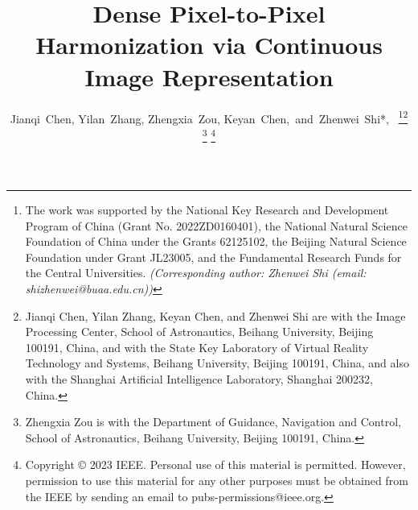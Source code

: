 \documentclass[10pt,journal,twocolumn,twoside]{IEEEtran}
\newcommand{\etal}{\textit{et al}. }
\begin{document}
\makeatletter
\DeclareRobustCommand\onedot{\futurelet\@let@token\@onedot}
\def\@onedot{\ifx\@let@token.\else.\null\fi\xspace}

\def\eg{\emph{e.g}\onedot} \def\Eg{\emph{E.g}\onedot}
\def\ie{\emph{i.e}\onedot} \def\Ie{\emph{I.e}\onedot}
\def\cf{\emph{cf}\onedot} \def\Cf{\emph{Cf}\onedot}
\def\etc{\emph{etc}\onedot} \def\vs{\emph{vs}\onedot}
\def\wrt{w.r.t\onedot} \def\dof{d.o.f\onedot}
\def\iid{i.i.d\onedot} \def\wolog{w.l.o.g\onedot}
\def\etal{\emph{et al}\onedot}
\makeatother

\title{Dense Pixel-to-Pixel Harmonization via Continuous Image Representation}
\author{Jianqi~Chen, Yilan~Zhang, Zhengxia~Zou, Keyan~Chen,~and~Zhenwei~Shi*,~
\thanks{The work was supported by the National Key Research and Development Program of China (Grant No. 2022ZD0160401), the National Natural Science Foundation of China under the Grants 62125102, the Beijing Natural Science Foundation under Grant JL23005, and the Fundamental Research Funds for the Central Universities. \textit{(Corresponding author: Zhenwei Shi (email: shizhenwei@buaa.edu.cn))}}\thanks{Jianqi Chen, Yilan Zhang, Keyan Chen, and Zhenwei Shi are with the Image Processing Center, School of Astronautics, Beihang University, Beijing 100191, China, and with the State Key Laboratory of Virtual Reality Technology and Systems, Beihang University, Beijing 100191, China, and also with the Shanghai Artificial Intelligence Laboratory, Shanghai 200232, China.}
\thanks{Zhengxia Zou is with the Department of Guidance, Navigation and Control, School of Astronautics, Beihang University, Beijing 100191, China.}
\thanks{Copyright © 2023 IEEE. Personal use of this material is permitted. However, permission to use this material for any other purposes must be obtained from the IEEE by sending an email to pubs-permissions@ieee.org.}
}


\maketitle
\end{document}
